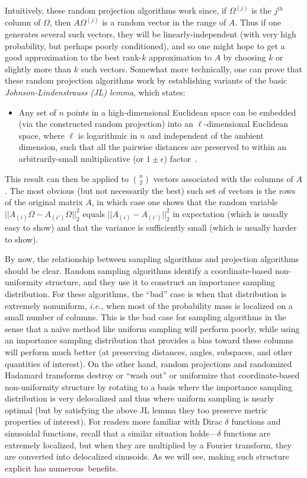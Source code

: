 \documentclass[twoside]{article}
\begin{document}
Intuitively, these random projection algorithms work since, if 
$\Omega^{(j)}$ is the $j^{th}$ column of $\Omega$, then $A\Omega^{(j)}$ is a 
random vector in the range of $A$.
Thus if one generates several such vectors, they will be 
linearly-independent (with very high probability, but perhaps poorly conditioned), and so one might hope 
to get a good approximation to the best rank-$k$ approximation to $A$ by 
choosing $k$ or slightly more than $k$ such vectors.
Somewhat more technically, one can prove that these random projection 
algorithms work by establishing variants of the basic 
\emph{Johnson-Lindenstrauss (JL) lemma}, which states:
\begin{itemize}
\item
Any set of $n$ points in a high-dimensional Euclidean space can be
embedded (via the constructed random projection) into an $\ell$-dimensional 
Euclidean space, where $\ell$ is logarithmic in $n$ and independent of the 
ambient dimension, such that all the pairwise distances are preserved to 
within an arbitrarily-small 
multiplicative
(or $1\pm\epsilon$)
factor~\cite{JL84,FH87,IM98,DG02,Ach03_JRNL,AC06,AC06-JRNL09,Matousek08_RSA}.
\end{itemize}
This result can then be applied to ${n \choose 2}$ vectors associated with 
the columns of $A$.
The most obvious (but not necessarily the best) such set of vectors is the 
rows of the original matrix $A$, in which case one shows that the random 
variable $||A_{(i)}\Omega-A_{(i')}\Omega||_2^2$ equals 
$||A_{(i)}-A_{(i')}||_2^2$ in expectation (which is usually easy to show) and that 
the variance is sufficiently small (which is usually harder to show).

By now, the relationship between sampling algorithms and projection 
algorithms should be clear.
Random sampling algorithms identify a coordinate-based non-uniformity 
structure, and they use it to construct an importance sampling distribution.
For these algorithms, the ``bad'' case is when that distribution is 
extremely nonuniform, \emph{i.e.}, when most of the probability mass is 
localized on a small number of columns.
This is the bad case for sampling algorithms in the sense that a na\"{i}ve
method like uniform sampling will perform poorly, while using an 
importance sampling distribution that provides a bias toward these columns 
will perform much better (at preserving distances, angles, subspaces, and
other quantities of interest).
On the other hand, random projections and randomized Hadamard transforms
destroy or ``wash out'' or uniformize that coordinate-based non-uniformity 
structure by rotating to a basis where the importance sampling distribution 
is very delocalized and thus where uniform sampling is nearly optimal (but 
by satisfying the above JL lemma they too preserve metric properties of 
interest).
For readers more familiar with Dirac $\delta$ functions and sinusoidal 
functions, recall that a similar situation holds---$\delta$ functions are 
extremely localized, but when they are multiplied by a Fourier transform, 
they are converted into delocalized sinusoids.
As we will see, making such structure explicit has numerous~benefits.
\end{document}

